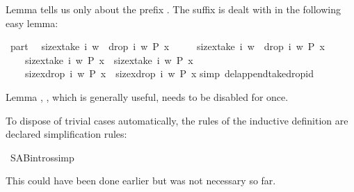 \begin{isabellebody}
\begin{isamarkuptext}
Lemma  tells us only about the prefix .
The suffix  is dealt with in the following easy lemma:%
\end{isamarkuptext}%
\ part{}{\isacharcolon}\isanewline
\ \ {\isachardoublequote}{\isasymlbrakk}size{\isacharbrackleft}x{\isasymin}take\ i\ w\ {\isacharat}\ drop\ i\ w{\isachardot}\ P\ x{\isacharbrackright}\ {\isacharequal}\isanewline
\ \ \ \ size{\isacharbrackleft}x{\isasymin}take\ i\ w\ {\isacharat}\ drop\ i\ w{\isachardot}\ {\isasymnot}P\ x{\isacharbrackright}{\isacharplus}{}{\isacharsemicolon}\isanewline
\ \ \ \ size{\isacharbrackleft}x{\isasymin}take\ i\ w{\isachardot}\ P\ x{\isacharbrackright}\ {\isacharequal}\ size{\isacharbrackleft}x{\isasymin}take\ i\ w{\isachardot}\ {\isasymnot}P\ x{\isacharbrackright}{\isacharplus}{}{\isasymrbrakk}\isanewline
\ \ \ {\isasymLongrightarrow}\ size{\isacharbrackleft}x{\isasymin}drop\ i\ w{\isachardot}\ P\ x{\isacharbrackright}\ {\isacharequal}\ size{\isacharbrackleft}x{\isasymin}drop\ i\ w{\isachardot}\ {\isasymnot}P\ x{\isacharbrackright}{\isacharplus}{}{\isachardoublequote}\isanewline
{}simp\ del{\isacharcolon}append{\isacharunderscore}take{\isacharunderscore}drop{\isacharunderscore}id{\isacharparenright}%
\begin{isamarkuptext}%
\noindent
Lemma , ,
which is generally useful, needs to be disabled for once.

To dispose of trivial cases automatically, the rules of the inductive
definition are declared simplification rules:%
\end{isamarkuptext}%
\ S{\isacharunderscore}A{\isacharunderscore}B{\isachardot}intros{\isacharbrackleft}simp{\isacharbrackright}%
\begin{isamarkuptext}%
\noindent
This could have been done earlier but was not necessary so far.


\end{isamarkuptext}
\end{isabellebody}
